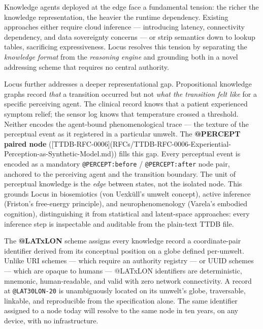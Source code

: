 \documentclass[11pt]{article}
\begin{document}
Knowledge agents deployed at the edge face a fundamental tension: the richer the knowledge representation, the heavier the runtime dependency. Existing approaches either require cloud inference --- introducing latency, connectivity dependency, and data sovereignty concerns --- or strip semantics down to lookup tables, sacrificing expressiveness. Locus resolves this tension by separating the \emph{knowledge format} from the \emph{reasoning engine} and grounding both in a novel addressing scheme that requires no central authority.

Locus further addresses a deeper representational gap. Propositional knowledge graphs record \emph{that} a transition occurred but not \emph{what the transition felt like} for a specific perceiving agent. The clinical record knows that a patient experienced symptom relief; the sensor log knows that temperature crossed a threshold. Neither encodes the agent-bound phenomenological trace --- the texture of the perceptual event as it registered in a particular umwelt. The \textbf{@PERCEPT paired node} ([TTDB-RFC-0006](RFCs/TTDB-RFC-0006-Experiential-Perception-as-Synthetic-Model.md)) fills this gap. Every perceptual event is encoded as a mandatory \texttt{@PERCEPT:before} / \texttt{@PERCEPT:after} node pair, anchored to the perceiving agent and the transition boundary. The unit of perceptual knowledge is the \emph{edge} between states, not the isolated node. This grounds Locus in biosemiotics (von Uexküll's umwelt concept), active inference (Friston's free-energy principle), and neurophenomenology (Varela's embodied cognition), distinguishing it from statistical and latent-space approaches: every inference step is inspectable and auditable from the plain-text TTDB file.

The \textbf{@LATxLON} scheme assigns every knowledge record a coordinate-pair identifier derived from its conceptual position on a globe defined per-umwelt. Unlike URI schemes --- which require an authority registry --- or UUID schemes --- which are opaque to humans --- @LATxLON identifiers are deterministic, mnemonic, human-readable, and valid with zero network connectivity. A record at \texttt{@LAT30LON-20} is unambiguously located on its umwelt's globe, traversable, linkable, and reproducible from the specification alone. The same identifier assigned to a node today will resolve to the same node in ten years, on any device, with no infrastructure.
\end{document}
